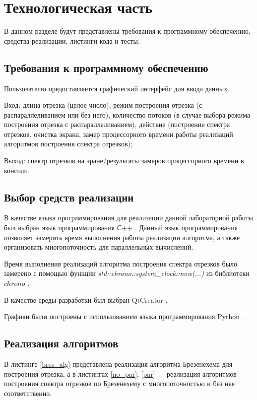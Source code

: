 \chapter{Технологическая часть}

В данном разделе будут представлены требования к программному обеспечению, средства реализации, листинги кода и тесты.

\section{Требования к программному обеспечению}
Пользователю предоставляется графический интерфейс для ввода данных.

Вход: длина отрезка (целое число), режим построения отрезка (с распараллеливанием или без него), количество потоков (в случае выбора режима построения отрезка с распараллеливанием), действие (построение спектра отрезков, очистка экрана, замер процессорного времени работы реализаций алгоритмов построения спектра отрезков);

Выход: спектр отрезков на эране/результаты замеров процессорного времени в консоли.

\section{Выбор средств реализации}

В качестве языка программирования для реализации данной лабораторной работы был выбран язык программирования С++ \cite{cpp}. Данный язык программирования позволяет замерить время выполнения работы реализации алгоритма, а также организовать многопоточность для параллельных вычислений.

Время выполнения реализаций алгоритма построения спектра отрезков было замерено с помощью функции \textit{std::chrono::system\_clock::now(...)} из библиотеки $chrono$ \cite{chrono}.

В качестве среды разработки был выбран QtCreator \cite{qt}. 

Графики были построены с использованием языка программирования Python \cite{PythonBook}.

\section{Реализация алгоритмов}

В листинге \ref{bres_alg} представлена реализация алгоритма Брезенехема для построения отрезка, а в листингах \ref{no_par}, \ref{par} --- реализация алгоритмов построения спектра отрезков по Брезенехему с многопоточностью и без нее соответственно.

